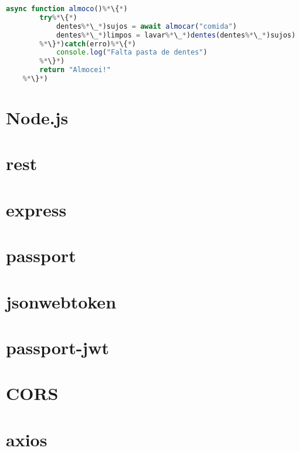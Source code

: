 \begin{lstlisting}[language=JavaScript, caption=Exemplo de uma função \textit{async}]
    async function almoco()%*\{*)
        try%*\{*)
            dentes%*\_*)sujos = await almocar("comida")
            dentes%*\_*)limpos = lavar%*\_*)dentes(dentes%*\_*)sujos)
        %*\}*)catch(erro)%*\{*)
            console.log("Falta pasta de dentes")
        %*\}*)
        return "Almocei!"
    %*\}*)
\end{lstlisting}

\section{Node.js}

\section{\acrshort{rest}}
\cite{restws}

\section{express}
\cite{wdmongo}

\section{passport}

\section{jsonwebtoken}

\section{passport-jwt}

\section{CORS}

\section{axios}

